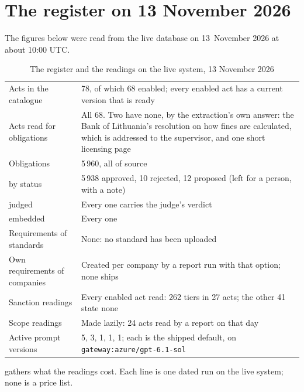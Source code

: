\section{The register on 13 November 2026}\label{sec:obligations:state}

The figures below were read from the live database on 13~November 2026 at about 10:00 UTC.

\begin{table}[H]
\caption{The register and the readings on the live system, 13 November 2026}\label{tab:obligations:state}
\begin{tabularx}{\textwidth}{@{}L{52mm}Y@{}}
\toprule
{} &  \\
\midrule
Acts in the catalogue & 78, of which 68 enabled; every enabled act has a current version that is ready \\
Acts read for obligations & All 68. Two have none, by the extraction's own answer: the Bank of Lithuania's resolution on how fines are calculated, which is addressed to the supervisor, and one short licensing page \\
Obligations & 5\,960, all of source  \\
\quad by status & 5\,938 approved, 10 rejected, 12 proposed (left for a person, with a note) \\
\quad judged & Every one carries the judge's verdict \\
\quad embedded & Every one \\
Requirements of standards & None: no standard has been uploaded \\
Own requirements of companies & Created per company by a report run with that option; none ships \\
Sanction readings & Every enabled act read: 262 tiers in 27 acts; the other 41 state none \\
Scope readings & Made lazily: 24 acts read by a report on that day \\
Active prompt versions &  5,  3,  1,  1,  1; each is the shipped default, on \texttt{gateway:azure/gpt-6.1-sol} \\
\bottomrule
\end{tabularx}
\end{table}

 gathers what the readings cost. Each line is one dated run on the
live system; none is a price list.

